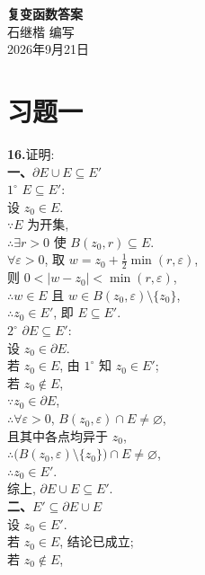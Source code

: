\documentclass{article}
\begin{document}
\begin{center}
	{\LARGE \textbf{复变函数答案}} \\[0.5cm]
	{\large {\kaishu 石继楷 \quad 编写}} \\[0.3cm]
	{\normalsize 2026年9月21日}
\end{center}

\section{习题一}

\noindent
\begin{minipage}[t]{0.5\textwidth}
	
	\textbf{16.}\quad 证明:\\[4pt]
	\textbf{一、$\partial E\cup E\subseteq E'$}\\[2pt]
	$1^\circ$ $E\subseteq E'$:\\
	设 $z_0\in E$.\\
	$\because E$ 为开集,\\
	$\therefore\exists r>0$ 使 $B(z_0,r)\subseteq E$.\\
	$\forall\varepsilon>0$, 取 $w=z_0+\frac{1}{2}\min(r,\varepsilon)$,\\
	则 $0<|w-z_0|<\min(r,\varepsilon)$,\\
	$\therefore w\in E$ 且 $w\in B(z_0,\varepsilon)\setminus\{z_0\}$,\\
	$\therefore z_0\in E'$, 即 $E\subseteq E'$.\\[4pt]
	$2^\circ$ $\partial E\subseteq E'$:\\
	设 $z_0\in\partial E$.\\
	若 $z_0\in E$, 由 $1^\circ$ 知 $z_0\in E'$;\\
	若 $z_0\notin E$,\\
	$\because z_0\in\partial E$,\\
	$\therefore\forall\varepsilon>0$, $B(z_0,\varepsilon)\cap E\neq\varnothing$,\\
	且其中各点均异于 $z_0$,\\
	$\therefore\big(B(z_0,\varepsilon)\setminus\{z_0\}\big)\cap E\neq\varnothing$,\\
	$\therefore z_0\in E'$.\\
	综上, $\partial E\cup E\subseteq E'$.\\[4pt]
	\textbf{二、$E'\subseteq\partial E\cup E$}\\[2pt]
	设 $z_0\in E'$.\\
	若 $z_0\in E$, 结论已成立;\\
	若 $z_0\notin E$,\\

\end{minipage}
\end{document}
